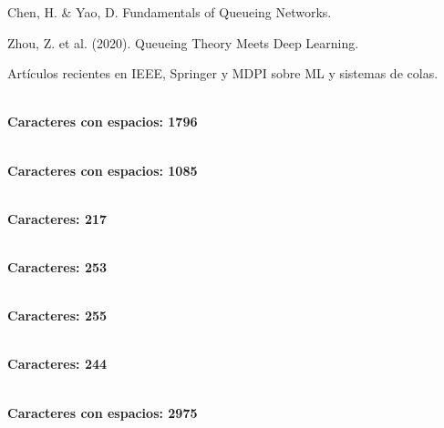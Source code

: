 \documentclass[12pt]{article}
\begin{document}
Chen, H. & Yao, D. Fundamentals of Queueing Networks.

Zhou, Z. et al. (2020). Queueing Theory Meets Deep Learning.

Artículos recientes en IEEE, Springer y MDPI sobre ML y sistemas de colas.

\\\textbf{Caracteres con espacios: 1796}

\\\textbf{Caracteres con espacios: 1085}

\\\textbf{Caracteres: 217}

\\\textbf{Caracteres: 253}

\\\textbf{Caracteres: 255}

\\\textbf{Caracteres: 244}

\\\textbf{Caracteres con espacios: 2975}
\end{document}
